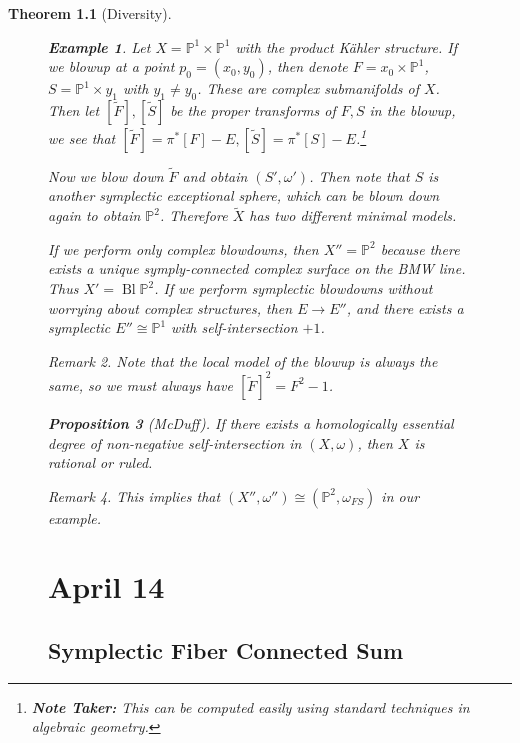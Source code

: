 \documentclass[leqno, openany]{memoir}
\newtheorem{thm}{Theorem}[chapter]
\newtheorem{prop}[thm]{Proposition}
\theoremstyle{definition}
\newtheorem{exm}[thm]{Example}
\theoremstyle{remark}
\newtheorem{rmk}[thm]{Remark}
\theoremstyle{plain}
\theoremstyle{definition}
\theoremstyle{remark}
\renewcommand{\P}{\mathbb{P}}
\newcommand{\wt}[1]{\widetilde{#1}}
\DeclareMathOperator{\Bl}{Bl} %
\begin{document}
\begin{thm}[Diversity]
\begin{figure}[H]
    \begin{exm} Let $X = \P^1 \times \P^1$ with the product K\"ahler structure.
        If we blowup at a point $p_0 = (x_0, y_0)$, then denote $F = x_0 \times
        \P^1$, $S = \P^1 \times y_1$ with $y_1 \neq y_0$. These are complex
        submanifolds of $X$. Then let $[\wt{F}], [\wt{S}]$ be the proper
        transforms of $F, S$ in the blowup, we see that $[\wt{F}] = \pi^* [F] -
        E, [\wt{S}] = \pi^*[S] - E$.\footnote{\textbf{Note Taker:} This can be
        computed easily using standard techniques in algebraic geometry.}

        Now we blow down $\wt{F}$ and obtain $(S', \omega')$. Then note that
        $S$ is another symplectic exceptional sphere, which can be blown down
        again to obtain $\P^2$. Therefore $\wt{X}$ has two different minimal
        models.

        If we perform only complex blowdowns, then $X'' = \P^2$ because there
    exists a unique symply-connected complex surface on the BMW line. Thus $X'
= \Bl \P^2$. If we perform symplectic blowdowns without worrying about complex
structures, then $E \to E''$, and there exists a symplectic $E'' \cong \P^1$
with self-intersection $+1$.  \end{exm}

    \begin{rmk} Note that the local model of the blowup is always the same, so
    we must always have $[\wt{F}]^2 = F^2 - 1$.  \end{rmk}

    \begin{prop}[McDuff] If there exists a homologically essential degree of
    non-negative self-intersection in $(X, \omega)$, then $X$ is rational or
ruled.  \end{prop}

    \begin{rmk} This implies that $(X'', \omega'') \cong (\P^2, \omega_{FS})$
    in our example.  \end{rmk}

    \chapter{April 14}%
    
    \section{Symplectic Fiber Connected Sum}%
    \label{sec:symplectic_fiber_connected_sum}
    

\end{figure}
\end{thm}
\end{document}
